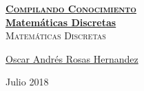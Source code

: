 \documentclass[12pt, fleqn]{report}                             %
\author{Oscar Andrés Rosas}                                     %
\theoremstyle{break}                                            %
\begin{document}
\begin{titlepage}
    
    \pagecolor{TitlePageColor}                                      %
    \color{white}                                                   %

    \vspace                                                         %
    \baselineskip                                                   %

    \makebox[0pt][l]{\rule{1.3\textwidth}{3pt}}                     %
    
    \href{https://compilandoconocimiento.com}                       %
    {\textbf{\textsc{\Huge Compilando Conocimiento}}}\\[2.7cm]      %

    \href{\ProjectNameLink}                                         %
    {\fontsize{40}{45}\selectfont \textbf{Matemáticas Discretas}}\\[0.5cm] %
    \textcolor{ColorSubtext}{\textsc{\Huge Matemáticas Discretas}}  %
    
    \vfill                                                          %
    
    \href{\ProjectAuthorLink}                                       %
    {\LARGE \textsf{Oscar Andrés Rosas Hernandez}}                  %

    \vspace                                                         %
    \baselineskip                                                   %
    
    {\large \textsf{Julio 2018}}                                    %

\end{titlepage}
\end{document}
